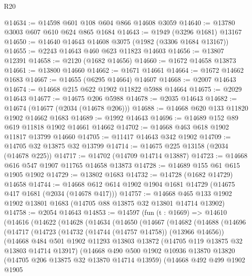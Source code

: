 \begin{lexlean}{R20}
\begin{coremodule}
@14634 := @14598 @601 @108 @604 @866 @14608 @3059
@14640 := @13780 @3003 @607 @610 @624 @865 @1684
@14643 := @1949 (@3296 @1681) @13167
@14650 := @14640 @14643 @14608 @3075 (@1982 (@3306 @1684 @13167))
@14655 := @2243 @14643 @460 @623 @11823 @14603
@14656 := @13807 @12391
@14658 := @2120 (@1682 @14656)
@14660 := @1672 @14658 @13873
@14661 := @13800 @14660
@14662 := @1671 @14661
@14664 := @1672 @14662 @1683
@14667 := @14655 (@6295 @14664) @14607
@14668 := @2007 @14643
@14674 := @14668 @215 @622 @1902 @11822 @5988 @14664
@14675 := @2029 @14643
@14677 := @14675 @206 @5988
@14678 := @2035 @14643
@14682 := @14674 (@14677 (@2034 (@14678 @206)))
@14688 := @14668 @620 @133 @11820 @1902 @14662 @1683
@14689 := @1992 @14643
@14696 := @14689 @152 @89 @619 @11818 @1902 @14661 @14662
@14702 := @14668 @463 @618 @1902 @11817 @13799 @14660
@14705 := @11417 @14643 @342 @1902
@14709 := @14705 @32 @13875 @32 @13799
@14714 := @14675 @225 @13158 (@2034 (@14678 @225))
@14717 := @14702 (@14709 @14714 @13887)
@14723 := @14668 @616 @547 @1907 @11765 @14658 @13873
@14728 := @14689 @155 @61 @615 @1905 @1902
@14729 := @13802 @1683
@14732 := @14728 (@1682 @14729) @14658
@14744 := @14668 @612 @614 @1902 @1904 @1681 @14729 (@14675 @417 @1681 (@2034 (@14678 @417)))
@14757 := @14668 @465 @133 @1902 @1902 @13801 @1683 (@14705 @88 @13875 @32 @13801 @14714 @13902)
@14758 := @2054 @14643
@14853 := @14597
    (fun (t : @1669) =>
    @14610
      (@14616
        (@14622
          (@14628
            (@14634
              (@14650
                (@14667
                  (@14682
                    (@14688
                      (@14696
                        (@14717
                          (@14723
                            (@14732 (@14744 (@14757 @14758)) (@13966 @14656))
                            (@14668
                              @484
                              @501
                              @1902
                              @11293
                              @13803
                              @13872
                              (@14705 @119 @13875 @32 @13803 @14714 @13917)
                              (@14668
                                @490
                                @500
                                @1902
                                @10936
                                @13870
                                @13820
                                (@14705 @206 @13875 @32 @13870 @14714 @13959)
                                (@14668
                                  @492
                                  @499
                                  @1902
                                  @1905

\end{coremodule}
\end{lexlean}
